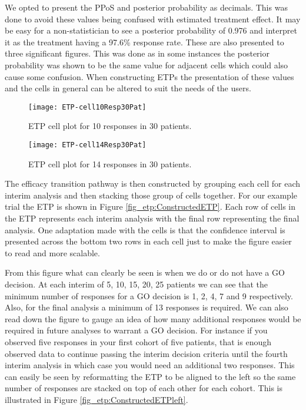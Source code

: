 We opted to present the PPoS and posterior probability as decimals. This was done to avoid these values being confused with estimated treatment effect. It may be easy for a non-statistician to see a posterior probability of 0.976 and interpret it as the treatment having a 97.6\% response rate. These are also presented to three significant figures. This was done as in some instances the posterior probability was shown to be the same value for adjacent cells which could also cause some confusion. When constructing ETPs the presentation of these values and the cells in general can be altered to suit the needs of the users. 

\begin{figure}[h!]
	\centering
	\caption{ETP cell plot for 10 responses in 30 patients.}
	\label{fig_etp:Cell10Resp30Pat}
	\texttt{[image: ETP-cell10Resp30Pat]}
\end{figure}


\begin{figure}[h!]
	\centering
	\caption{ETP cell plot for 14 responses in 30 patients.}
	\label{fig_etp:Cell14Resp30Pat}
	\texttt{[image: ETP-cell14Resp30Pat]}
\end{figure}


The efficacy transition pathway is then constructed by grouping each cell for each interim analysis and then stacking those group of cells together. For our example trial the ETP is shown in Figure \ref{fig_etp:ConstructedETP}. Each row of cells in the ETP represents each interim analysis with the final row representing the final analysis. One adaptation made with the cells is that the confidence interval is presented across the bottom two rows in each cell just to make the figure easier to read and more scalable. 

From this figure what can clearly be seen is when we do or do not have a GO decision. At each interim of 5, 10, 15, 20, 25 patients we can see that the minimum number of responses for a GO decision is 1, 2, 4, 7 and 9 respectively. Also, for the final analysis a minimum of 13 responses is required. We can also read down the figure to gauge an idea of how many additional responses would be required in future analyses to warrant a GO decision. For instance if you observed five responses in your first cohort of five patients, that is enough observed data to continue passing the interim decision criteria until the fourth interim analysis in which case you would need an additional two responses. This can easily be seen by reformatting the ETP to be aligned to the left so the same number of responses are stacked on top of each other for each cohort. This is illustrated in Figure \ref{fig_etp:ConstructedETPleft}. 

